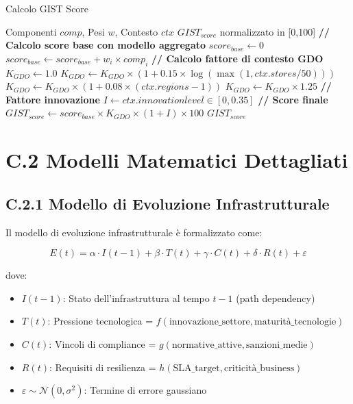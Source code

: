 \begin{algorithm}
\caption{Calcolo GIST Score}
\label{alg:gist}
\begin{algorithmic}[1]
\Require Componenti $comp$, Pesi $w$, Contesto $ctx$
\Ensure $GIST_{score}$ normalizzato in [0,100]
\State \textbf{// Calcolo score base con modello aggregato}
\State $score_{base} \gets 0$
    \State $score_{base} \gets score_{base} + w_i \times comp_i$
\EndFor
\State \textbf{// Calcolo fattore di contesto GDO}
\State $K_{GDO} \gets 1.0$
\State $K_{GDO} \gets K_{GDO} \times (1 + 0.15 \times \log(\max(1, ctx.stores/50)))$
\State $K_{GDO} \gets K_{GDO} \times (1 + 0.08 \times (ctx.regions - 1))$
\State $K_{GDO} \gets K_{GDO} \times 1.25$ 
\State \textbf{// Fattore innovazione}
\State $I \gets ctx.innovation\mathit{level} \in [0, 0.35]$
\State \textbf{// Score finale}
\State $GIST_{score} \gets score_{base} \times K_{GDO} \times (1 + I) \times 100$
\State \Return $GIST_{score}$
\end{algorithmic}
\end{algorithm}

\section{C.2 Modelli Matematici Dettagliati}

\subsection{C.2.1 Modello di Evoluzione Infrastrutturale}

Il modello di evoluzione infrastrutturale è formalizzato come:

\begin{equation}
E(t) = \alpha \cdot I(t-1) + \beta \cdot T(t) + \gamma \cdot C(t) + \delta \cdot R(t) + \varepsilon
\label{eq:evolution}
\end{equation}

dove:
\begin{itemize}
    \item $I(t-1)$: Stato dell'infrastruttura al tempo $t-1$ (path dependency)
    \item $T(t)$: Pressione tecnologica = $f(\text{innovazione\_settore}, \text{maturità\_tecnologie})$
    \item $C(t)$: Vincoli di compliance = $g(\text{normative\_attive}, \text{sanzioni\_medie})$
    \item $R(t)$: Requisiti di resilienza = $h(\text{SLA\_target}, \text{criticità\_business})$
    \item $\varepsilon \sim \mathcal{N}(0, \sigma^2)$: Termine di errore gaussiano
\end{itemize}

